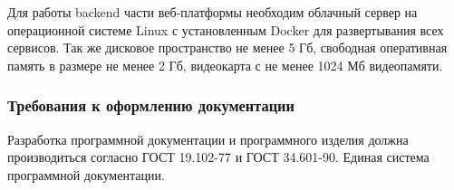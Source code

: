 Для работы backend части веб-платформы необходим облачный сервер на операционной системе Linux с установленным Docker для развертывания всех сервисов. Так же дисковое пространство не менее 5 Гб, свободная оперативная память в размере не менее 2 Гб, видеокарта с не менее 1024 Мб видеопамяти.

\subsubsection{Требования к оформлению документации}

Разработка программной документации и программного изделия должна производиться согласно ГОСТ 19.102-77 и ГОСТ 34.601-90. Единая система программной документации.
